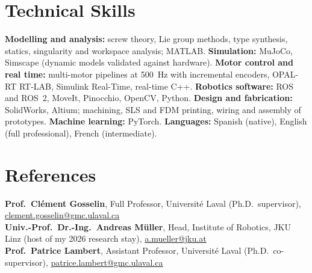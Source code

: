 \documentclass[11pt,letterpaper]{article}
\begin{document}
\section{Technical Skills}
{\footnotesize
\textbf{Modelling and analysis:} screw theory, Lie group methods, type synthesis, statics, singularity and workspace
analysis; MATLAB. \quad \textbf{Simulation:} MuJoCo, Simscape (dynamic models validated against hardware).
\quad \textbf{Motor control and real time:} multi-motor pipelines at 500~Hz with incremental encoders, OPAL-RT RT-LAB,
Simulink Real-Time, real-time C++. \quad \textbf{Robotics software:} ROS and ROS~2, MoveIt, Pinocchio, OpenCV, Python.
\quad \textbf{Design and fabrication:} SolidWorks, Altium; machining, SLS and FDM printing, wiring and assembly of prototypes.
\quad \textbf{Machine learning:} PyTorch.
\quad \textbf{Languages:} Spanish (native), English (full professional), French (intermediate).}

\section{References}
{\footnotesize
\textbf{Prof.~Cl\'ement Gosselin}, Full Professor, Universit\'e Laval (Ph.D.\ supervisor),
\href{mailto:clement.gosselin@gmc.ulaval.ca}{clement.gosselin@gmc.ulaval.ca}\\
\textbf{Univ.-Prof.~Dr.-Ing.~Andreas M\"uller}, Head, Institute of Robotics, JKU Linz (host of my 2026 research stay),
\href{mailto:a.mueller@jku.at}{a.mueller@jku.at}\\
\textbf{Prof.~Patrice Lambert}, Assistant Professor, Universit\'e Laval (Ph.D.\ co-supervisor),
\href{mailto:patrice.lambert@gmc.ulaval.ca}{patrice.lambert@gmc.ulaval.ca}}
\end{document}
